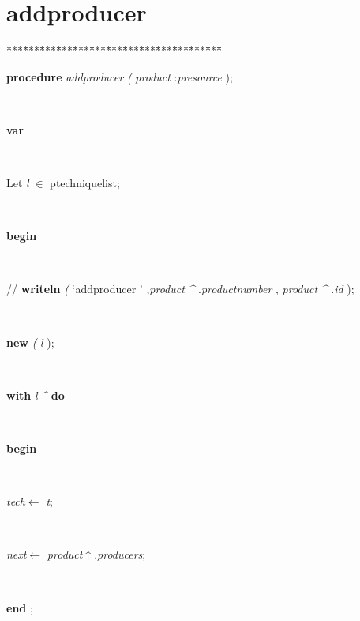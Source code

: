 \section{addproducer}\label{sec:technologies/hash/defineproductlist/buildProducerIndex/buildUserIndex/defineTechniqueaddproducer}

\begin{tabbing}
***\=***\=***\=***\=***\=***\=***\=***\=***\=***\=***\=***\=***\=\kill
\parbox{14cm}{\textsf{\textbf{procedure}  \textit{addproducer} \textit{(} \textit{product} :\textit{presource}  );}}\\
\+\parbox{14cm}{\textsf{\textbf{var} }}\\
\parbox{14cm}{\textsf{Let \textit{l} $\in$ ptechniquelist;}}\\
\-\<\+\parbox{14cm}{\textsf{\textbf{begin} }}\\
\parbox{14cm}{\textsf{//  \textbf{writeln} \textit{(} \textrm{\textup { `addproducer ' } },\textit{product} \textit{\^{}} .\textit{productnumber} , \textit{product} \textit{\^{}} .\textit{id} );}}\\
\parbox{14cm}{\textsf{\textbf{new} \textit{(} \textit{l} );}}\\
\+\parbox{14cm}{\textsf {\textbf {with } \textsf{ \textit{l} \textit{\^{}}  } \textbf{ do } }}\\
\<\parbox{14cm}{\textsf{\textbf{begin} }}\\
\parbox{14cm}{\textsf{\textit{tech}$\leftarrow$ \textit{t}}; }\\
\parbox{14cm}{\textsf{\textit{next}$\leftarrow$ \textit{product}$\uparrow$.\textit{producers}}; }\\
\<\-\parbox{14cm}{\textsf{\textbf{end} ;}}\\
\end{tabbing}
